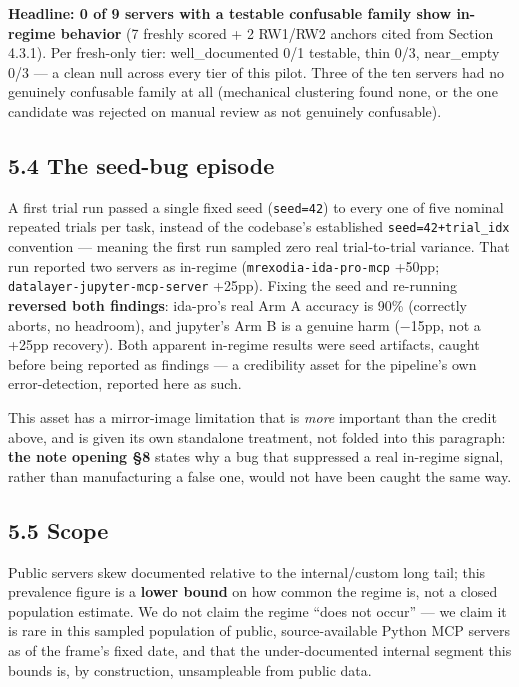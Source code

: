 \textbf{Headline: 0 of 9 servers with a testable confusable family show
in-regime behavior} (7 freshly scored + 2 RW1/RW2 anchors cited from
Section 4.3.1). Per fresh-only tier: well\_documented 0/1 testable, thin
0/3, near\_empty 0/3 --- a clean null across every tier of this pilot.
Three of the ten servers had no genuinely confusable family at all
(mechanical clustering found none, or the one candidate was rejected on
manual review as not genuinely confusable).

\hypertarget{the-seed-bug-episode}{%
\subsection{5.4 The seed-bug episode}\label{the-seed-bug-episode}}

A first trial run passed a single fixed seed (\texttt{seed=42}) to every
one of five nominal repeated trials per task, instead of the codebase's
established \texttt{seed=42+trial\_idx} convention --- meaning the first
run sampled zero real trial-to-trial variance. That run reported two
servers as in-regime (\texttt{mrexodia-ida-pro-mcp} +50pp;
\texttt{datalayer-jupyter-mcp-server} +25pp). Fixing the seed and
re-running \textbf{reversed both findings}: ida-pro's real Arm A
accuracy is 90\% (correctly aborts, no headroom), and jupyter's Arm B is
a genuine harm (−15pp, not a +25pp recovery). Both apparent in-regime
results were seed artifacts, caught before being reported as findings
--- a credibility asset for the pipeline's own error-detection, reported
here as such.

This asset has a mirror-image limitation that is \emph{more} important
than the credit above, and is given its own standalone treatment, not
folded into this paragraph: \textbf{the note opening §8} states why a bug that
suppressed a real in-regime signal, rather than manufacturing a false
one, would not have been caught the same way.

\hypertarget{scope}{%
\subsection{5.5 Scope}\label{scope}}

Public servers skew documented relative to the internal/custom long
tail; this prevalence figure is a \textbf{lower bound} on how common the
regime is, not a closed population estimate. We do not claim the regime
``does not occur'' --- we claim it is rare in this sampled population of
public, source-available Python MCP servers as of the frame's fixed
date, and that the under-documented internal segment this bounds is, by
construction, unsampleable from public data.

